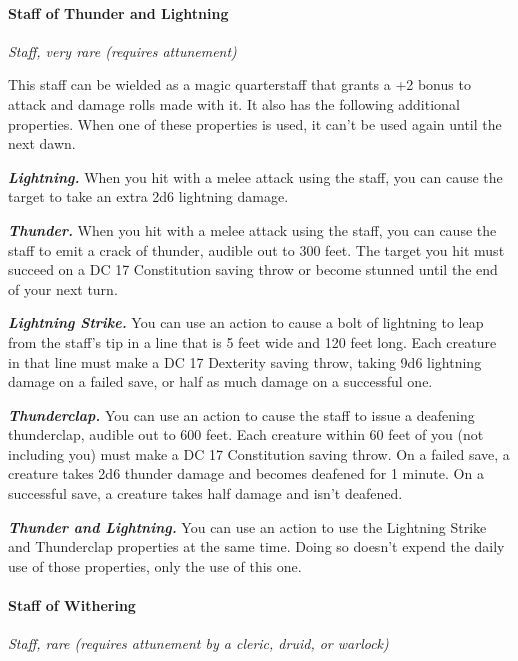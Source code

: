 \documentclass[
]{article}
\begin{document}
\hypertarget{staff-of-thunder-and-lightning}{%
\paragraph{Staff of Thunder and
Lightning}\label{staff-of-thunder-and-lightning}}

\emph{Staff, very rare (requires attunement)}

This staff can be wielded as a magic quarterstaff that grants a +2 bonus
to attack and damage rolls made with it. It also has the following
additional properties. When one of these properties is used, it can't be
used again until the next dawn.

\emph{\textbf{Lightning.}} When you hit with a melee attack using the
staff, you can cause the target to take an extra 2d6 lightning damage.

\emph{\textbf{Thunder.}} When you hit with a melee attack using the
staff, you can cause the staff to emit a crack of thunder, audible out
to 300 feet. The target you hit must succeed on a DC 17 Constitution
saving throw or become stunned until the end of your next turn.

\emph{\textbf{Lightning Strike.}} You can use an action to cause a bolt
of lightning to leap from the staff's tip in a line that is 5 feet wide
and 120 feet long. Each creature in that line must make a DC 17
Dexterity saving throw, taking 9d6 lightning damage on a failed save, or
half as much damage on a successful one.

\emph{\textbf{Thunderclap.}} You can use an action to cause the staff to
issue a deafening thunderclap, audible out to 600 feet. Each creature
within 60 feet of you (not including you) must make a DC 17 Constitution
saving throw. On a failed save, a creature takes 2d6 thunder damage and
becomes deafened for 1 minute. On a successful save, a creature takes
half damage and isn't deafened.

\emph{\textbf{Thunder and Lightning.}} You can use an action to use the
Lightning Strike and Thunderclap properties at the same time. Doing so
doesn't expend the daily use of those properties, only the use of this
one.

\hypertarget{staff-of-withering}{%
\paragraph{Staff of Withering}\label{staff-of-withering}}

\emph{Staff, rare (requires attunement by a cleric, druid, or warlock)}
\end{document}
